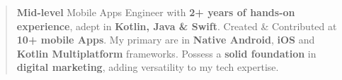 \documentclass[10pt,a4paper,ragged2e,withhyper]{altacv}
\begin{document}


%


    \makecvheader



    \begin{quote}

        \textbf{Mid-level}  Mobile Apps Engineer with \textbf{2+ years of hands-on experience},
        adept in \textbf{Kotlin, Java \& Swift}.
        Created \& Contributed at \textbf{10+ mobile Apps}.
        My primary are in \textbf{Native Android}, \textbf{iOS} and \textbf{Kotlin Multiplatform} frameworks.
        Possess a \textbf{solid foundation} in \textbf{digital marketing}, adding versatility to my tech expertise.
    \end{quote}
\end{document}
